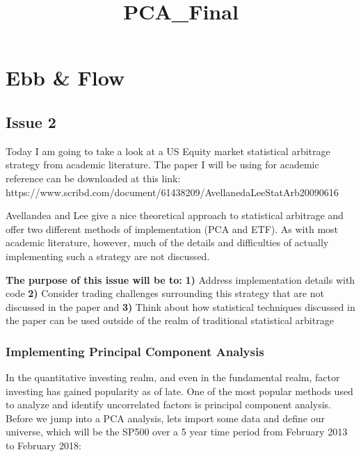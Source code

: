 \documentclass[11pt]{article}
\title{PCA\_Final}
\begin{document}
    
    
    \maketitle
    
    

    
    \section{Ebb \& Flow}\label{ebb-flow}

    \subsection{Issue 2}\label{issue-2}

    Today I am going to take a look at a US Equity market statistical
arbitrage strategy from academic literature. The paper I will be using
for academic reference can be downloaded at this link:
https://www.scribd.com/document/61438209/AvellanedaLeeStatArb20090616

Avellandea and Lee give a nice theoretical approach to statistical
arbitrage and offer two different methods of implementation (PCA and
ETF). As with most academic literature, however, much of the details and
difficulties of actually implementing such a strategy are not discussed.

\textbf{The purpose of this issue will be to:} \textbf{1)} Address
implementation details with code \textbf{2)} Consider trading challenges
surrounding this strategy that are not discussed in the paper and
\textbf{3)} Think about how statistical techniques discussed in the
paper can be used outside of the realm of traditional statistical
arbitrage

    \subsubsection{Implementing Principal Component
Analysis}\label{implementing-principal-component-analysis}

    In the quantitative investing realm, and even in the fundamental realm,
factor investing has gained popularity as of late. One of the most
popular methods used to analyze and identify uncorrelated factors is
principal component analysis. Before we jump into a PCA analysis, lets
import some data and define our universe, which will be the SP500 over a
5 year time period from February 2013 to February 2018:
\end{document}
